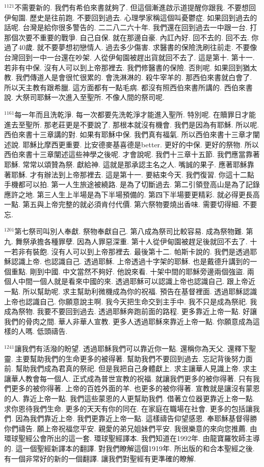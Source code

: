 \documentclass{book}
\begin{document}
$^{1121}$不需要新的.
我們有希伯來書就夠了.
但這個漸進啟示道提醒你跟我.
不要想回伊甸園.
歷史是往前跑.
不要回到過去.
心理學家稱這個叫憂鬱症.
如果回到過去的話呢.
台灣是給你很多警告的.
二二八二六十年.
我們還在回到過去一中跟一台.
打那個次要不重要的戰爭.
自己自保.
就在那邊自豪.
內訌內好.
回不去的.
回不去.
你過了40歲.
就不要夢想初戀情人.
過去多少傷害.
求醫書的保險洗刷往前走.
不要像台灣回到一中一台還在吵架.
人從伊甸園被趕出貨就回不去了.
這是第十.
第十一.
若非有中保.
沒有人可以到上帝那裡去.
我們修醫書的保險.
否則呢.
如果回到猶太教.
我們傳道人是會很忙很累的.
會洗淋淋的.
殺牛宰羊的.
那西伯來書就白會了.
所以天主教有跟希臘.
這方面都有一點毛病.
都沒有照西伯來書所講的.
西伯來書說.
大祭司耶穌一次進入至聖所.
不像人間的祭司呢.

$^{1161}$每一年而且洗乾淨.
每一次都要先洗乾淨才能進入聖所.
特別呢.
在贖罪日才能進去至聖所.
那老莊更是不要說了.
那根本就沒有機會.
我們是因為有耶穌.
所以呢.
西伯來書十三章講的對.
如果有耶穌中保.
我們真有福氣.
所以西伯來書十三章才闡述說.
耶穌比摩西更重要.
比安德麥基喜德是better.
更好的中保.
更好的祭物.
所以西伯來書十三章闡述這些神學之後呢.
才會說呢.
我們十三章十五節.
我們應當靠著耶穌.
常常以頌贊為祭.
獻給神.
這就是那承認主名之人.
嘴誠的果子.
應著耶穌靠著耶穌.
才有辦法到上帝那裡去.
這是第十一.
要結束今天.
我們復習.
你這十二點手機都可以拍.
第一人生旅途被繞路.
是為了切斷過去.
第二引領登高山是為了記錄應許之地.
第三人生上半場是為下半場預備的.
第四下半場要更精彩.
就必得更長高一點.
第五與上帝完整的就必須肯付代價.
第六祭物要燒出香味.
需要切得細.
不要忘.

$^{1201}$第七祭司叫別人奉獻.
祭物奉獻自己.
第八成為祭司比較容易.
成為祭物難.
第九.
舞祭承擔各種罪孽.
因為人罪惡深重.
第十人從伊甸園被趕足後就回不去了.
十一若非有裝飽.
沒有人可以到上帝那裡去.
最後第十二.
帕斯卡說的.
我們是透過耶穌認識上帝.
也認識自己.
透過耶穌.
上帝透過十字架的耶穌.
也是戴德升講到的一個重點.
剛到中國.
中文當然不夠好.
他說來看.
十架中間的耶穌旁邊兩個強盜.
兩個人中間一個人就是看來中國的來.
透過耶穌可以認識上帝也認識自己.
跟上帝近一點.
所以幫助呢.
求主幫助利微機成為你的祝福.
預告在基督裡面.
透過耶穌認識上帝也認識自己.
你願意說主啊.
我今天把生命交到主手中.
我不只是成為祭祀.
我成為祭物.
我要不要回到過去.
透過耶穌奔跑前面的路程.
更多靠近上帝一點.
好讓我們的骨肉之間.
華人非華人宣教.
更多人透過耶穌來靠近上帝一點.
你願意成為這樣的人嗎.
低頭禱告.

$^{1241}$讓我們有活潑的盼望.
透過耶穌我們可以靠近你一點.
還稱你為天父.
還釋下聖靈.
主要幫助我們的生命更多的被得著.
幫助我們不要回到過去.
忘記背後努力面前.
幫助我們成為君真的祭祀.
但是我把自己身體獻上.
求主讓華人見識上帝.
求主讓華人教會每一個人.
正式成為普世宣教的祝福.
就讓我們更多的被你得著.
只有我們更多的被你得著.
上帝的百姓外面的羊.
也更多的被你得著.
宣教就是讓沒有蒙恩的人.
靠近上帝一點.
我們這些蒙恩的人更幫助我們.
借著立位器更靠近上帝一點.
求你恩待我們生命.
更多的天天有你的同在.
在家庭在職場在社會.
更多的包括讓我們.
因為我們靠近上帝.
我們更靠近上帝一點.
這樣禱告仰望感恩.
奉耶穌基督得勝你們禱告.
願上帝祝福您平安.
親愛的弟兄姐妹們平安.
我很樂意的來向您推薦.
由環球聖經公會所出的這一套.
環球聖經譯本.
我們知道在1992年.
由龍寶羅牧師主導的.
這一個聖經新譯本的翻譯.
對我們瞭解這個1919年.
所出版的和合本聖經之後.
有一個非常好的新的一個翻譯.
讓我們對聖經有更準確的瞭解.
\end{document}
